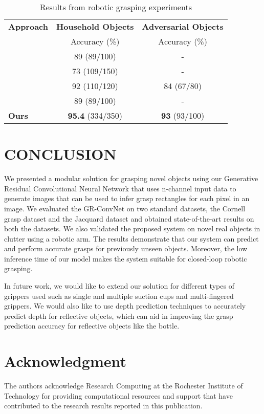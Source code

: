 \documentclass[letterpaper, 10pt, conference]{IEEEtran}
\begin{document}
\begin{table}
\begin{center}
\caption{Results from robotic grasping experiments}
\label{tab:novel_results}
\begin{tabular}{l c c}
\hline
\textbf{Approach} & \textbf{Household Objects} & \textbf{Adversarial Objects} \\
 & Accuracy (\%) & Accuracy (\%) \\
\hline
\cite{lenz2015deep} & 89 (89/100) & - \\
\cite{pinto2016supersizing} & 73 (109/150) & - \\
\cite{morrison2019learning} & 92 (110/120) & 84 (67/80) \\
\cite{chu2018real} & 89 (89/100) & - \\
\hline
\textbf{Ours} & \textbf{95.4} (334/350) & \textbf{93} (93/100) \\
\hline
\end{tabular}
\end{center}
\end{table}



\section{CONCLUSION}
We presented a modular solution for grasping novel objects using our Generative Residual Convolutional Neural Network that uses n-channel input data to generate images that can be used to infer grasp rectangles for each pixel in an image. We evaluated the GR-ConvNet on two standard datasets, the Cornell grasp dataset and the Jacquard dataset and obtained state-of-the-art results on both the datasets. We also validated the proposed system on novel real objects in clutter using a robotic arm. The results demonstrate that our system can predict and perform accurate grasps for previously unseen objects. Moreover, the low inference time of our model makes the system suitable for closed-loop robotic grasping.

In future work, we would like to extend our solution for different types of grippers used such as single and multiple suction cups and multi-fingered grippers. We would also like to use depth prediction techniques to accurately predict depth for reflective objects, which can aid in improving the grasp prediction accuracy for reflective objects like the bottle.



\section*{Acknowledgment}

The authors acknowledge Research Computing \cite{ritrc} at the Rochester Institute of Technology for providing computational resources and support that have contributed to the research results reported in this publication.




  
\end{document}
